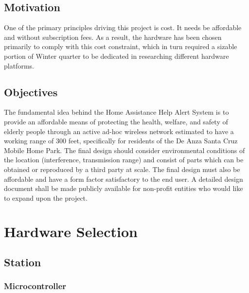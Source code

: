 \documentclass[journal]{IEEEtran}
\begin{document}
\subsection{Motivation}
\noindent One of the primary principles driving this project is cost.  It needs be affordable and without subscription fees.  As a result, the hardware has been chosen primarily to comply with this cost constraint, which in turn required a sizable portion of Winter quarter to be dedicated in researching different hardware platforms.

\subsection{Objectives}
\noindent The fundamental idea behind the Home Assistance Help Alert System is to provide an affordable means of protecting the health, welfare, and safety of elderly people through an active ad-hoc wireless network estimated to have a working range of 300 feet, specifically for residents of the De Anza Santa Cruz Mobile Home Park.  The final design should consider environmental conditions of the location (interference, transmission range) and consist of parts which can be obtained or reproduced by a third party at scale.  The final design must also be affordable and have a form factor satisfactory to the end user.  A detailed design document shall be made publicly available for non-profit entities who would like to expand upon the project.

\section{Hardware Selection}

\subsection{Station}

\subsubsection{Microcontroller}
\end{document}
